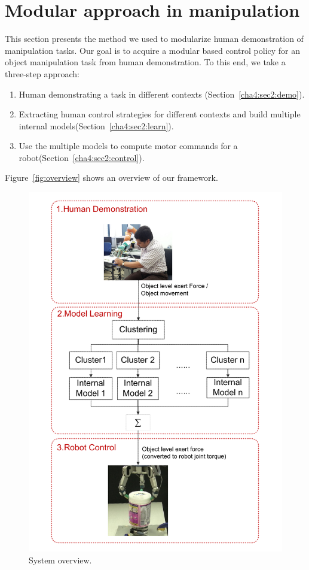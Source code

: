 \section{Modular approach in manipulation}
\label{cha4:sec2}


This section presents the method we used to modularize human demonstration of manipulation tasks. Our goal is to acquire a modular based control policy for an object manipulation task from human demonstration. To this end, we take a three-step approach:
\begin{enumerate}
\item Human demonstrating a task in different contexts (Section~\ref{cha4:sec2:demo}).
\item Extracting human control strategies for different contexts and build multiple internal models(Section~\ref{cha4:sec2:learn}).
\item Use the multiple models to compute motor commands for a robot(Section~\ref{cha4:sec2:control}).
\end{enumerate}

Figure~\ref{fig:overview} shows an overview of our framework.

\begin{figure}
  \centering
   \includegraphics[width=15cm]{./fig_cha4/overview3.pdf}
  \caption{ \scriptsize{System overview.}
  \label{fig:overview}
}
\label{fig:demo}
\end{figure}

